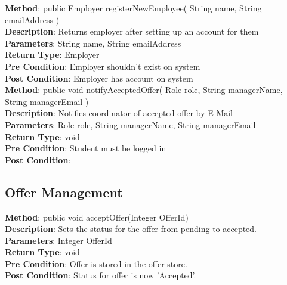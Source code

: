 \documentclass{l3deliverable}
\begin{document}
\textbf{Method}: public Employer registerNewEmployee( String name, String emailAddress )\\
\textbf{Description}: Returns employer after setting up an account for them\\
\textbf{Parameters}: String name, String emailAddress\\
\textbf{Return Type}: Employer\\
\textbf{Pre Condition}: Employer shouldn't exist on system\\
\textbf{Post Condition}: Employer has account on system\\


\textbf{Method}: public void notifyAcceptedOffer( Role role, String managerName, String managerEmail )\\
\textbf{Description}: Notifies coordinator of accepted offer by E-Mail\\
\textbf{Parameters}: Role role, String managerName, String managerEmail\\
\textbf{Return Type}: void\\
\textbf{Pre Condition}: Student must be logged in\\
\textbf{Post Condition}:\\

\subsection{Offer Management}

\textbf{Method}: public void acceptOffer(Integer OfferId) \\
\textbf{Description}: Sets the status for the offer from pending to accepted.\\
\textbf{Parameters}: Integer OfferId\\
\textbf{Return Type}: void\\
\textbf{Pre Condition}: Offer is stored in the offer store.\\
\textbf{Post Condition}: Status for offer is now 'Accepted'.\\
\end{document}
